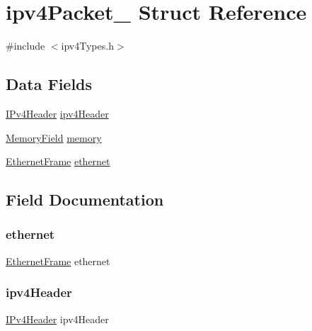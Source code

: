 \hypertarget{structipv4_packet__}{}\section{ipv4\+Packet\+\_\+ Struct Reference}
\label{structipv4_packet__}


{\ttfamily \#include $<$ipv4\+Types.\+h$>$}

\subsection*{Data Fields}
\begin{DoxyCompactItemize}
\item 
\mbox{\hyperlink{group__ipv4_ga2156b3eb915651d02d24799ac03a602b}{I\+Pv4\+Header}} \mbox{\hyperlink{structipv4_packet___ab51277a55b25e1951c2f8f7d876963e6}{ipv4\+Header}}
\item 
\mbox{\hyperlink{group__memory_gae2c54b1b1aca949825bf68fe618c8e97}{Memory\+Field}} \mbox{\hyperlink{structipv4_packet___a7dd6a3160ed58904a4699e281fc4617b}{memory}}
\item 
\mbox{\hyperlink{ethernet_types_8h_a4ebb2d31f9c7739f76b97c8ee0a7b702}{Ethernet\+Frame}} \mbox{\hyperlink{structipv4_packet___aac5466b4a2ccecbe65f4a0b0d734ddb7}{ethernet}}
\end{DoxyCompactItemize}


\subsection{Field Documentation}
\mbox{\label{structipv4_packet___aac5466b4a2ccecbe65f4a0b0d734ddb7}} 
\subsubsection{\texorpdfstring{ethernet}{ethernet}}
{\footnotesize\ttfamily \mbox{\hyperlink{ethernet_types_8h_a4ebb2d31f9c7739f76b97c8ee0a7b702}{Ethernet\+Frame}} ethernet}

\mbox{\label{structipv4_packet___ab51277a55b25e1951c2f8f7d876963e6}} 
\subsubsection{\texorpdfstring{ipv4Header}{ipv4Header}}
{\footnotesize\ttfamily \mbox{\hyperlink{group__ipv4_ga2156b3eb915651d02d24799ac03a602b}{I\+Pv4\+Header}} ipv4\+Header}

